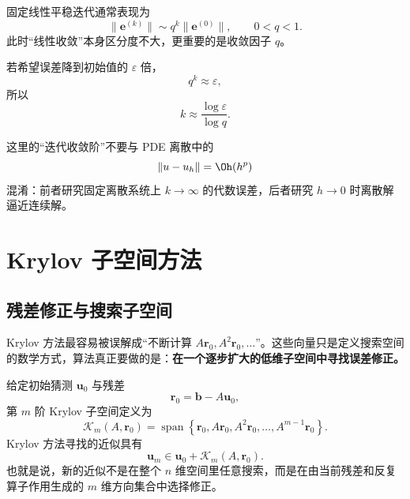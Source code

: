 固定线性平稳迭代通常表现为
\begin{equation}
\|\bm e^{(k)}\|
\sim
q^k\|\bm e^{(0)}\|,
\qquad
0<q<1.
\label{eq:linear-solvers-geometric-convergence}
\end{equation}
此时“线性收敛”本身区分度不大，更重要的是收敛因子 $q$。

若希望误差降到初始值的 $\varepsilon$ 倍，
\begin{equation}
q^k\approx\varepsilon,
\end{equation}
所以
\begin{equation}
k
\approx
\frac{\log\varepsilon}{\log q}.
\label{eq:linear-solvers-iteration-count}
\end{equation}

这里的“迭代收敛阶”不要与 PDE 离散中的
\begin{equation}
\|u-u_h\|=\Oh(h^p)
\end{equation}
混淆：前者研究固定离散系统上 $k\to\infty$ 的代数误差，后者研究 $h\to0$ 时离散解逼近连续解。

\section{Krylov 子空间方法}
\label{sec:krylov-methods}

\subsection{残差修正与搜索子空间}

Krylov 方法最容易被误解成“不断计算 $A\bm r_0,A^2\bm r_0,\ldots$”。这些向量只是定义搜索空间的数学方式，算法真正要做的是：\textbf{在一个逐步扩大的低维子空间中寻找误差修正。}

给定初始猜测 $\bm u_0$ 与残差
\begin{equation}
\bm r_0
=
\bm b-A\bm u_0,
\end{equation}
第 $m$ 阶 Krylov 子空间定义为
\begin{equation}
\mathcal K_m(A,\bm r_0)
=
\operatorname{span}
\left\{
\bm r_0,
A\bm r_0,
A^2\bm r_0,
\ldots,
A^{m-1}\bm r_0
\right\}.
\label{eq:krylov-space}
\end{equation}
Krylov 方法寻找的近似具有
\begin{equation}
\boxed{
\bm u_m
\in
\bm u_0+\mathcal K_m(A,\bm r_0).
}
\label{eq:krylov-affine-space}
\end{equation}
也就是说，新的近似不是在整个 $n$ 维空间里任意搜索，而是在由当前残差和反复算子作用生成的 $m$ 维方向集合中选择修正。

